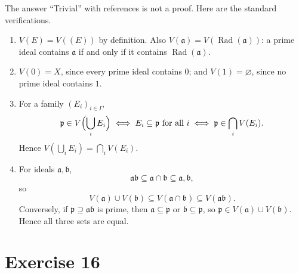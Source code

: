 \documentclass[11pt]{article}
\DeclareMathOperator{\Rad}{Rad}
\newcommand{\fp}{\mathfrak p}
\newcommand{\fa}{\mathfrak a}
\newcommand{\fb}{\mathfrak b}
\begin{document}
The answer ``Trivial'' with references is not a proof.  Here are the standard
verifications.

\begin{enumerate}[label=(\roman*)]
  \item \(V(E)=V((E))\) by definition.  Also
        \(V(\fa)=V(\Rad(\fa))\): a prime ideal contains \(\fa\) if and only if
        it contains \(\Rad(\fa)\).

  \item \(V(0)=X\), since every prime ideal contains \(0\); and
        \(V(1)=\varnothing\), since no prime ideal contains \(1\).

  \item For a family \((E_i)_{i\in I}\),
        \[
        \fp\in V\Bigl(\bigcup_iE_i\Bigr)
        \iff E_i\subseteq\fp\ \text{for all }i
        \iff \fp\in\bigcap_iV(E_i).
        \]
        Hence \(V(\bigcup_iE_i)=\bigcap_iV(E_i)\).

  \item For ideals \(\fa,\fb\),
        \[
        \fa\fb\subseteq\fa\cap\fb\subseteq\fa,\fb,
        \]
        so
        \[
        V(\fa)\cup V(\fb)\subseteq V(\fa\cap\fb)\subseteq V(\fa\fb).
        \]
        Conversely, if \(\fp\supseteq\fa\fb\) is prime, then
        \(\fa\subseteq\fp\) or \(\fb\subseteq\fp\), so
        \(\fp\in V(\fa)\cup V(\fb)\).  Hence all three sets are equal.
\end{enumerate}

\section*{Exercise 16}
\end{document}
